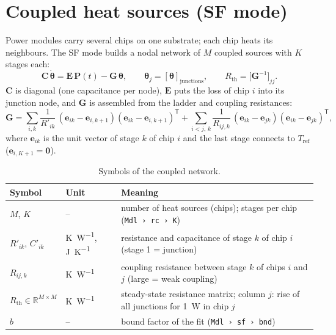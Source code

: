 \documentclass[11pt,a4paper]{article}
\newcommand{\Rth}{R_{\mathrm{th}}}
\newcommand{\Tref}{T_{\mathrm{ref}}}
\newcommand{\T}{^{\mathsf T}}
\newcommand{\mat}[1]{\bm{#1}}
\newcommand{\cfg}[1]{\texttt{#1}}
\newcommand{\R}{\mathbb{R}}
\begin{document}
\section{Coupled heat sources (SF mode)}\label{sec:sf}
Power modules carry several chips on one substrate; each chip heats its neighbours. The SF mode builds a nodal
network of $M$ coupled sources with $K$ stages each:
\begin{equation}
  \mat C\,\dot{\bm\theta} = \mat E\,\bm P(t) - \mat G\,\bm\theta,\qquad
  \bm\theta_j = [\bm\theta]_{\text{junctions}},\qquad \Rth = \bigl[\mat G^{-1}\bigr]_{jj}.
  \label{eq:sf}
\end{equation}
$\mat C$ is diagonal (one capacitance per node), $\mat E$ puts the loss of chip $i$ into its junction node, and
$\mat G$ is assembled from the ladder and coupling resistances:
\begin{equation}
  \mat G = \sum_{i,k}\frac{1}{R'_{ik}}\,(\bm e_{ik}-\bm e_{i,k+1})(\bm e_{ik}-\bm e_{i,k+1})\T
         + \sum_{i<j,\,k}\frac{1}{R_{ij,k}}\,(\bm e_{ik}-\bm e_{jk})(\bm e_{ik}-\bm e_{jk})\T ,
\end{equation}
where $\bm e_{ik}$ is the unit vector of stage $k$ of chip $i$ and the last stage connects to $\Tref$
($\bm e_{i,K+1}=\bm 0$).

\begin{table}[h]\centering\small
\caption{Symbols of the coupled network.}
\begin{tabularx}{\linewidth}{@{}llX@{}}\toprule
Symbol & Unit & Meaning \\\midrule
$M$, $K$ & -- & number of heat sources (chips); stages per chip (\cfg{Mdl › rc › K}) \\
$R'_{ik}$, $C'_{ik}$ & \si{\kelvin\per\watt}, \si{\joule\per\kelvin} & resistance and capacitance of stage $k$ of chip $i$ (stage 1 = junction) \\
$R_{ij,k}$ & \si{\kelvin\per\watt} & coupling resistance between stage $k$ of chips $i$ and $j$ (large = weak coupling) \\
$\Rth\in\R^{M\times M}$ & \si{\kelvin\per\watt} & steady-state resistance matrix; column $j$: rise of all junctions for \SI{1}{\watt} in chip $j$ \\
$b$ & -- & bound factor of the fit (\cfg{Mdl › sf › bnd}) \\\bottomrule
\end{tabularx}
\end{table}
\end{document}
